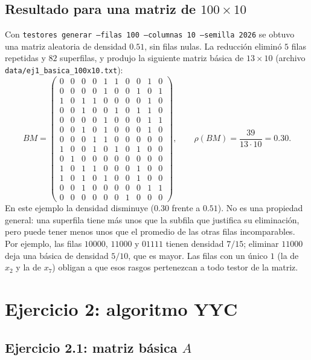 \documentclass[11pt, a4paper]{article}
\theoremstyle{definition}
\theoremstyle{plain}
\newcommand{\x}[1]{x_{#1}}
\begin{document}
\subsection{Resultado para una matriz de $100\times 10$}
Con \texttt{testores generar --filas 100 --columnas 10 --semilla 2026} se
obtuvo una matriz aleatoria de densidad $0.51$, sin filas nulas. La reducción
eliminó $5$ filas repetidas y $82$ superfilas, y produjo la siguiente matriz
básica de $13\times 10$ (archivo \texttt{data/ej1\_basica\_100x10.txt}):
\[
BM=\left(\begin{array}{cccccccccc}
0&0&0&0&1&1&0&0&1&0\\
0&0&0&0&1&0&0&1&0&1\\
1&0&1&1&0&0&0&0&1&0\\
0&0&1&0&0&1&0&1&1&0\\
0&0&0&0&1&0&0&0&1&1\\
0&0&1&0&1&0&0&0&1&0\\
0&0&0&1&1&0&0&0&0&0\\
1&0&0&1&0&1&0&1&0&0\\
0&1&0&0&0&0&0&0&0&0\\
1&0&1&1&0&0&0&1&0&0\\
1&0&1&0&1&0&0&1&0&0\\
0&0&1&0&0&0&0&0&1&1\\
0&0&0&0&0&0&1&0&0&0
\end{array}\right),
\qquad
\rho(BM)=\frac{39}{13\cdot 10}=0.30 .
\]
En este ejemplo la densidad disminuye ($0.30$ frente a $0.51$). No es una
propiedad general: una superfila tiene más unos que la subfila que justifica
su eliminación, pero puede tener menos unos que el promedio de las otras filas
incomparables. Por ejemplo, las filas $10000$, $11000$ y $01111$ tienen densidad
$7/15$; eliminar $11000$ deja una básica de densidad $5/10$, que es mayor.
Las filas con un único $1$ (la de $\x2$ y la de $\x7$) obligan a que esos rasgos
pertenezcan a todo testor de la matriz.

\section{Ejercicio 2: algoritmo YYC}

\subsection{Ejercicio 2.1: matriz básica $A$}
\end{document}
